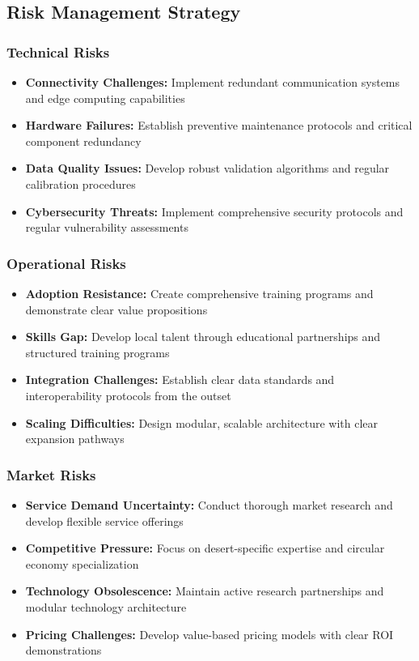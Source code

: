 \subsection{Risk Management Strategy}

\subsubsection{Technical Risks}
\begin{itemize}
    \item \textbf{Connectivity Challenges:} Implement redundant communication systems and edge computing capabilities
    \item \textbf{Hardware Failures:} Establish preventive maintenance protocols and critical component redundancy
    \item \textbf{Data Quality Issues:} Develop robust validation algorithms and regular calibration procedures
    \item \textbf{Cybersecurity Threats:} Implement comprehensive security protocols and regular vulnerability assessments
\end{itemize}

\subsubsection{Operational Risks}
\begin{itemize}
    \item \textbf{Adoption Resistance:} Create comprehensive training programs and demonstrate clear value propositions
    \item \textbf{Skills Gap:} Develop local talent through educational partnerships and structured training programs
    \item \textbf{Integration Challenges:} Establish clear data standards and interoperability protocols from the outset
    \item \textbf{Scaling Difficulties:} Design modular, scalable architecture with clear expansion pathways
\end{itemize}

\subsubsection{Market Risks}
\begin{itemize}
    \item \textbf{Service Demand Uncertainty:} Conduct thorough market research and develop flexible service offerings
    \item \textbf{Competitive Pressure:} Focus on desert-specific expertise and circular economy specialization
    \item \textbf{Technology Obsolescence:} Maintain active research partnerships and modular technology architecture
    \item \textbf{Pricing Challenges:} Develop value-based pricing models with clear ROI demonstrations
\end{itemize}

